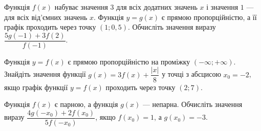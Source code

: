\documentclass[12pt]{article}
\begin{document}
\begin{samepage}
\par{}
\end{samepage}


\begin{samepage}
\noindent\zadnum Функція $f(x)$ набуває значення $3$ для всіх додатних значень $x$ і значення $1$ — для всіх від'ємних значень $x$. Функція $y=g(x)$ є прямою пропорційністю, а її графік проходить через точку $(1; 0{,}5)$. Обчисліть значення виразу $\dfrac{5g(-1) + 3f(2)}{f(-1)}$. 

\nmtnobreak
\nopagebreak\nbvspace{0.3cm}
\nmtAnswerBox
\par{}
\end{samepage}

\begin{samepage}
\noindent\zadnum Функція $y=f(x)$ є прямою пропорційністю на проміжку $(-\infty; +\infty)$. Знайдіть значення функції $g(x) = 3f(x) + \dfrac{|x|}{8}$ у точці з абсцисою $x_0 = -2$, якщо графік функції $y=f(x)$ проходить через точку $(2; 7)$. 

\nmtnobreak
\nopagebreak\nbvspace{0.3cm}
\nmtAnswerBox
\par{}
\end{samepage}

\begin{samepage}
\noindent\zadnum Функція $f(x)$ є парною, а функція $g(x)$ — непарна. Обчисліть значення виразу $\dfrac{4g(-x_0) + 2f(x_0)}{5f(-x_0)}$, якщо $f(x_0)=1$, а $g(x_0)=-3$. 

\nmtnobreak
\nopagebreak\nbvspace{0.3cm}
\nmtAnswerBox
\par{}
\end{samepage}
\end{document}
